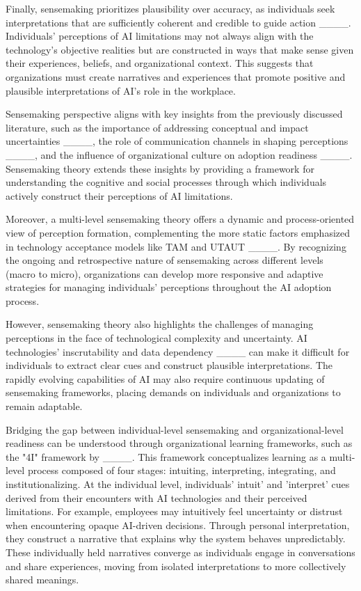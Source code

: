 Finally, sensemaking prioritizes plausibility over accuracy, as individuals seek interpretations that are sufficiently coherent and credible to guide action ____. Individuals' perceptions of AI limitations may not always align with the technology's objective realities but are constructed in ways that make sense given their experiences, beliefs, and organizational context. This suggests that organizations must create narratives and experiences that promote positive and plausible interpretations of AI's role in the workplace.

Sensemaking perspective aligns with key insights from the previously discussed literature, such as the importance of addressing conceptual and impact uncertainties ____, the role of communication channels in shaping perceptions ____, and the influence of organizational culture on adoption readiness ____. Sensemaking theory extends these insights by providing a framework for understanding the cognitive and social processes through which individuals actively construct their perceptions of AI limitations.

Moreover, a multi-level sensemaking theory offers a dynamic and process-oriented view of perception formation, complementing the more static factors emphasized in technology acceptance models like TAM and UTAUT ____. By recognizing the ongoing and retrospective nature of sensemaking across different levels (macro to micro), organizations can develop more responsive and adaptive strategies for managing individuals' perceptions throughout the AI adoption process.

However, sensemaking theory also highlights the challenges of managing perceptions in the face of technological complexity and uncertainty. AI technologies' inscrutability and data dependency ____ can make it difficult for individuals to extract clear cues and construct plausible interpretations. The rapidly evolving capabilities of AI may also require continuous updating of sensemaking frameworks, placing demands on individuals and organizations to remain adaptable.

Bridging the gap between individual-level sensemaking and organizational-level readiness can be understood through organizational learning frameworks, such as the "4I" framework by ____. This framework conceptualizes learning as a multi-level process composed of four stages: intuiting, interpreting, integrating, and institutionalizing. At the individual level, individuals' intuit' and 'interpret' cues derived from their encounters with AI technologies and their perceived limitations. For example, employees may intuitively feel uncertainty or distrust when encountering opaque AI-driven decisions. Through personal interpretation, they construct a narrative that explains why the system behaves unpredictably. These individually held narratives converge as individuals engage in conversations and share experiences, moving from isolated interpretations to more collectively shared meanings.

